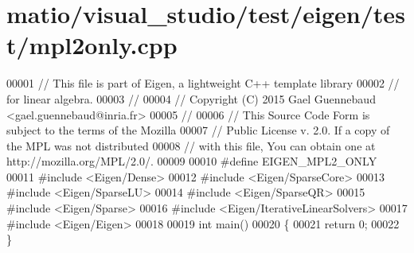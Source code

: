 \hypertarget{matio_2visual__studio_2test_2eigen_2test_2mpl2only_8cpp_source}{}\section{matio/visual\+\_\+studio/test/eigen/test/mpl2only.cpp}
\label{matio_2visual__studio_2test_2eigen_2test_2mpl2only_8cpp_source}

\begin{DoxyCode}
00001 \textcolor{comment}{// This file is part of Eigen, a lightweight C++ template library}
00002 \textcolor{comment}{// for linear algebra.}
00003 \textcolor{comment}{//}
00004 \textcolor{comment}{// Copyright (C) 2015 Gael Guennebaud <gael.guennebaud@inria.fr>}
00005 \textcolor{comment}{//}
00006 \textcolor{comment}{// This Source Code Form is subject to the terms of the Mozilla}
00007 \textcolor{comment}{// Public License v. 2.0. If a copy of the MPL was not distributed}
00008 \textcolor{comment}{// with this file, You can obtain one at http://mozilla.org/MPL/2.0/.}
00009 
00010 \textcolor{preprocessor}{#define EIGEN\_MPL2\_ONLY}
00011 \textcolor{preprocessor}{#include <Eigen/Dense>}
00012 \textcolor{preprocessor}{#include <Eigen/SparseCore>}
00013 \textcolor{preprocessor}{#include <Eigen/SparseLU>}
00014 \textcolor{preprocessor}{#include <Eigen/SparseQR>}
00015 \textcolor{preprocessor}{#include <Eigen/Sparse>}
00016 \textcolor{preprocessor}{#include <Eigen/IterativeLinearSolvers>}
00017 \textcolor{preprocessor}{#include <Eigen/Eigen>}
00018 
00019 \textcolor{keywordtype}{int} main()
00020 \{
00021   \textcolor{keywordflow}{return} 0;
00022 \}
\end{DoxyCode}
